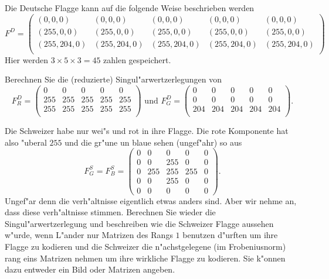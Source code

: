 \documentclass[a4,11pt]{article}
\begin{document}
\vspace*{-17mm}
{
\kopf
}



\begin{aufgabe}[4 Punkte]
Die Deutsche Flagge kann auf die folgende Weise beschrieben werden
\[
F^D = \begin{pmatrix}
(0,0,0) & (0,0,0) & (0,0,0) & (0,0,0) & (0,0,0) \\
(255,0,0) & (255,0,0) & (255,0,0) & (255,0,0) & (255,0,0) \\
(255,204,0) & (255,204,0) & (255,204,0) & (255,204,0) & (255,204,0) \\
\end{pmatrix}
\]
Hier werden $3 \times 5 \times 3 = 45$ zahlen gespeichert.

Berechnen Sie die  (reduzierte) Singul"arwertzerlegungen von
\[
F^D_R = \begin{pmatrix}
0 & 0 & 0 & 0 & 0 \\
255 & 255 & 255 & 255 & 255 \\
255 & 255 & 255 &255 & 255 \\
\end{pmatrix}
\text{ und }
F^D_G = \begin{pmatrix}
0 & 0 & 0 & 0 & 0 \\
0 & 0 & 0 & 0 & 0 \\
204 & 204 & 204 &204 & 204 \\
\end{pmatrix}.
\]

Die Schweizer habe nur wei"s und rot in ihre Flagge. Die rote Komponente hat also "uberal $255$ und die gr"une un blaue sehen (ungef"ahr) so aus
\[
F^S_G = F^S_B = \begin{pmatrix}
0 & 0 & 0 & 0 & 0 \\
0 & 0 & 255 & 0 & 0 \\
0 & 255 & 255 & 255 & 0 \\
0 & 0 & 255 & 0 & 0 \\
0 & 0 & 0 & 0 & 0
\end{pmatrix}.
\]
Ungef"ar denn die verh"altnisse eigentlich etwas anders sind. Aber wir nehme an, dass diese verh"altnisse stimmen.
Berechnen Sie wieder die Singul"arwertzerlegung und beschreiben wie die Schweizer Flagge aussehen w"urde, wenn L"ander nur Matrizen des Rangs $1$ benutzen d"urften um ihre Flagge zu kodieren und die Schweizer die n"achstgelegene (im Frobeniusnorm) rang eins Matrizen nehmen um ihre wirkliche Flagge zu kodieren. Sie k"onnen dazu entweder ein Bild oder Matrizen angeben.
\end{aufgabe}
\end{document}
